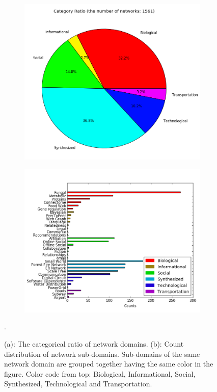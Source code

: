 \documentclass{article}
\begin{document}
\begin{figure}[H]
\begin{subfigure}{0.40\textwidth}
\includegraphics[width=\linewidth]{figs/category_ratio.png}
\caption{}\label{domain_ratio}
\end{subfigure}\hspace*{\fill}
\begin{subfigure}{0.45\textwidth}
\includegraphics[width=\linewidth]{figs/subdomain_dist.png}
\caption{}\label{sub_dist}
\end{subfigure}\hspace*{\fill}

\caption{(a): The categorical ratio of network domains. (b):  Count distribution of network sub-domains. Sub-domains of the same network domain are grouped together having the same color in the figure. Color code from top: Biological, Informational, Social, Synthesized, Technological and Transportation.} \label{category_dist}.
\end{figure}
\end{document}
